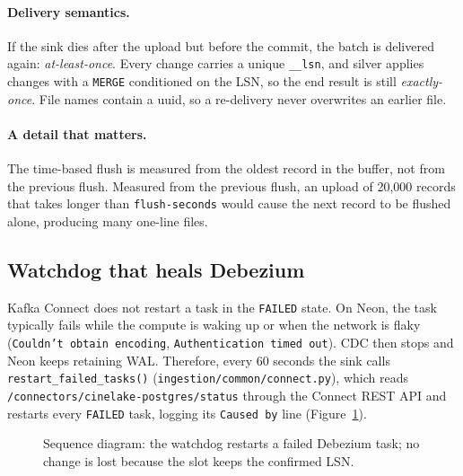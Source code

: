 \documentclass[12pt,a4paper]{article}
\newcommand{\code}[1]{\texttt{#1}}
\begin{document}
\paragraph{Delivery semantics.} If the sink dies after the upload but before the commit, the batch is delivered
again: \emph{at-least-once}. Every change carries a unique \code{\_\_lsn}, and silver applies changes with a
\code{MERGE} conditioned on the LSN, so the end result is still \emph{exactly-once}. File names contain a uuid, so a
re-delivery never overwrites an earlier file.

\paragraph{A detail that matters.} The time-based flush is measured from the oldest record in the buffer, not from
the previous flush. Measured from the previous flush, an upload of 20,000 records that takes longer than
\code{flush-seconds} would cause the next record to be flushed alone, producing many one-line files.

\subsection{Watchdog that heals Debezium}
Kafka Connect does not restart a task in the \code{FAILED} state. On Neon, the task typically fails while the compute
is waking up or when the network is flaky (\code{Couldn't obtain encoding}, \code{Authentication timed out}). CDC then
stops and Neon keeps retaining WAL. Therefore, every 60 seconds the sink calls \code{restart\_failed\_tasks()}
(\code{ingestion/common/connect.py}), which reads \code{/connectors/cinelake-postgres/status} through the Connect REST
API and restarts every \code{FAILED} task, logging its \code{Caused by} line (Figure~\ref{fig:seq-watchdog}).

\begin{figure}[H]
\centering
{}
\caption{Sequence diagram: the watchdog restarts a failed Debezium task; no change is lost because the slot keeps
the confirmed LSN.}
\label{fig:seq-watchdog}
\end{figure}
\end{document}
